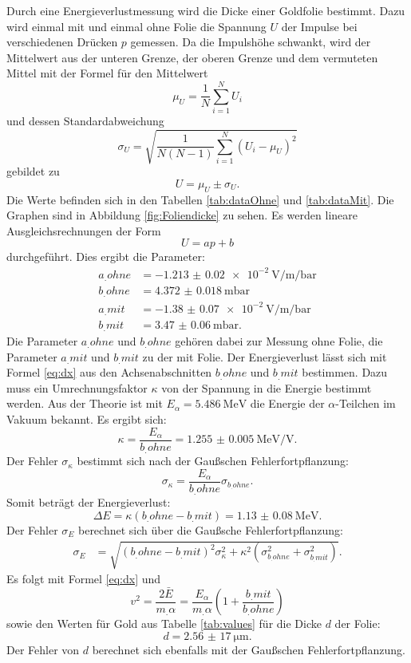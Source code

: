 Durch eine Energieverlustmessung wird die Dicke einer Goldfolie bestimmt. Dazu wird einmal mit und einmal ohne Folie die Spannung $U$ der Impulse bei verschiedenen Drücken $p$ gemessen. Da die Impulshöhe schwankt, wird der Mittelwert aus der unteren Grenze, der oberen Grenze und dem vermuteten Mittel mit der Formel für den Mittelwert
\[
\mu_U = \frac{1}{N}\sum_{i=1}^N U_i
\]
und dessen Standardabweichung
\[
\sigma_U = \sqrt{\frac{1}{N(N-1)}\sum_{i=1}^N (U_i-\mu_U)^2}
\]
gebildet zu
\[
U = \mu_U \pm \sigma_U \text{.}
\]
Die Werte befinden sich in den Tabellen \ref{tab:dataOhne} und \ref{tab:dataMit}. Die Graphen sind in Abbildung \ref{fig:Foliendicke} zu sehen.
Es werden lineare Ausgleichsrechnungen der Form
\[
U = ap + b
\]
durchgeführt. Dies ergibt die Parameter:
\begin{align*}
a_.{ohne} &= \SI{-1.213(20)e-2}{\volt\per\milli\per\bar}\\
b_.{ohne} &= \SI{4.372(18)}{\milli\bar}\\
a_.{mit}  &= \SI{-1.38(7)e-2}{\volt\per\milli\per\bar}\\
b_.{mit}  &= \SI{3.47(6)}{\milli\bar}\text{.}
\end{align*}
Die Parameter $a_.{ohne}$ und $b_.{ohne}$ gehören dabei zur Messung ohne Folie, die Parameter $a_.{mit}$ und $b_.{mit}$ zu der mit Folie.
Der Energieverlust lässt sich mit Formel \eqref{eq:dx} aus den Achsenabschnitten $b_.{ohne}$ und $b_.{mit}$ bestimmen. Dazu muss ein Umrechnungsfaktor $\kappa$ von der Spannung in die Energie bestimmt werden. Aus der Theorie ist mit $E_\alpha=\SI{5,486}{\mega\electronvolt}$ die Energie der $\alpha$-Teilchen im Vakuum bekannt. Es ergibt sich:
\[
\kappa = \frac{E_\alpha}{b_.{ohne}} = \SI{1.255(5)}{\mega\electronvolt\per\volt}\text{.}
\]
Der Fehler $\sigma_\kappa$ bestimmt sich nach der Gaußschen Fehlerfortpflanzung:
\[
\sigma_\kappa = \frac{E_\alpha}{b_.{ohne}}\sigma_{b_.{ohne}}\text{.}
\]
Somit beträgt der Energieverlust:
\[
\Delta E = \kappa(b_.{ohne}-b_.{mit}) = \SI{1.13(8)}{\mega\electronvolt} \text{.}
\]
Der Fehler $\sigma_E$ berechnet sich über die Gaußsche Fehlerfortpflanzung:
\begin{align*}
\sigma_E &= \sqrt{(b_.{ohne}-b_.{mit})^2\sigma_\kappa^2+\kappa^2\left(\sigma_{b_.{ohne}}^2+\sigma_{b_.{mit}}^2\right)}\text{.}
\end{align*}
Es folgt mit Formel \eqref{eq:dx} und
\[
v^2=\frac{2\bar{E}}{m_.{\alpha}}=\frac{E_{\alpha}}{m_.{\alpha}}\left(1+\frac{b_.{mit}}{b_.{ohne}}\right)
\]
sowie den Werten für Gold aus Tabelle \ref{tab:values} für die Dicke $d$ der Folie:
\[
d = \SI{2,56(17)}{\micro\metre}\text{.}
\]
Der Fehler von $d$ berechnet sich ebenfalls mit der Gaußschen Fehlerfortpflanzung.

